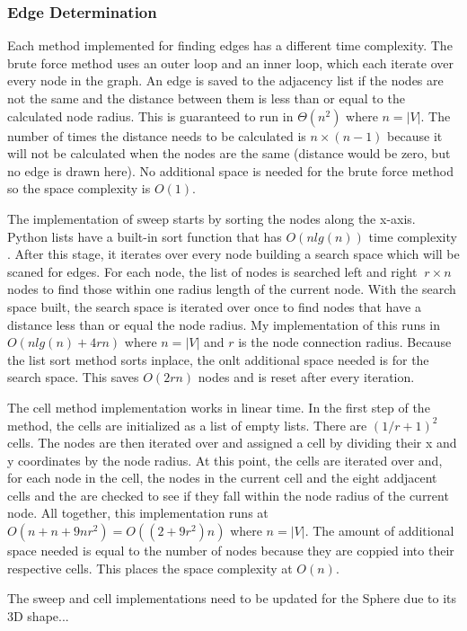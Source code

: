 \documentclass{article}
\begin{document}
        \subsubsection{Edge Determination}
        Each method implemented for finding edges has a different time complexity. The brute force method uses an outer loop and an inner loop, which each iterate over every node in the graph. An edge is saved to the adjacency list if the nodes are not the same and the distance between them is less than or equal to the calculated node radius. This is guaranteed to run in $\Theta\left(n^2\right)$ where $n = |V|$. The number of times the distance needs to be calculated is $n \times (n-1)$ because it will not be calculated when the nodes are the same (distance would be zero, but no edge is drawn here). No additional space is needed for the brute force method so the space complexity is $O(1)$.
        \par
        The implementation of sweep starts by sorting the nodes along the x-axis. Python lists have a built-in sort function that has $O\left(n lg(n)\right)$ time complexity \cite{listsort}. After this stage, it iterates over every node building a search space which will be scaned for edges. For each node, the list of nodes is searched left and right $~r\times n$ nodes to find those within one radius length of the current node. With the search space built, the search space is iterated over once to find nodes that have a distance less than or equal the node radius. My implementation of this runs in $O\left(n lg(n) + 4rn\right)$ where $n = |V|$ and $r$ is the node connection radius. Because the list sort method sorts inplace, the onlt additional space needed is for the search space. This saves $O(2rn)$ nodes and is reset after every iteration.
        \par
        The cell method implementation works in linear time. In the first step of the method, the cells are initialized as a list of empty lists. There are $(1/r + 1)^2$ cells. The nodes are then iterated over and assigned a cell by dividing their x and y coordinates by the node radius. At this point, the cells are iterated over and, for each node in the cell, the nodes in the current cell and the eight addjacent cells and the are checked to see if they fall within the node radius of the current node. All together, this implementation runs at $O\left(n + n + 9nr^2\right) = O\left((2 + 9r^2)n\right)$ where $n = |V|$. The amount of additional space needed is equal to the number of nodes because they are coppied into their respective cells. This places the space complexity at $O(n)$.
        \par
        The sweep and cell implementations need to be updated for the Sphere due to its 3D shape...
\end{document}
